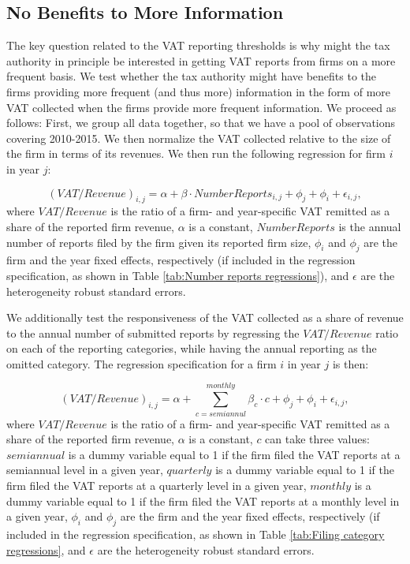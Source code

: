 \subsection{No Benefits to More Information}
\label{subsec:methodology-more-information}
The key question related to the VAT reporting thresholds is why might
the tax authority in principle be interested in getting VAT reports
from firms on a more frequent basis. We test whether the tax authority
might have benefits to the firms providing more frequent (and thus
more) information in the form of more VAT collected when the firms
provide more frequent information. We proceed as follows: First, we
group all data together, so that we have a pool of observations covering
2010-2015. We then normalize the VAT collected relative to the size
of the firm in terms of its revenues. We then run the following regression
for firm $i$ in year $j$:

\begin{equation}
(VAT/Revenue)_{i,j}=\alpha+\beta\cdot NumberReports_{i,j}+\phi_{j}+\phi_{i}+\epsilon_{i,j},
\end{equation}
where $VAT/Revenue$ is the ratio of a firm- and year-specific VAT
remitted as a share of the reported firm revenue, $\alpha$ is a constant,
$NumberReports$ is the annual number of reports filed by the firm
given its reported firm size, $\phi_{i}$ and $\phi_{j}$ are the
firm and the year fixed effects, respectively (if included in the
regression specification, as shown in Table \ref{tab:Number reports regressions}),
and $\epsilon$ are the heterogeneity robust standard errors.

We additionally test the responsiveness of the VAT collected as a
share of revenue to the annual number of submitted reports by regressing
the $VAT/Revenue$ ratio on each of the reporting categories, while
having the annual reporting as the omitted category. The regression
specification for a firm $i$ in year $j$ is then:

\begin{equation}
(VAT/Revenue)_{i,j}=\alpha+\sum_{c=semiannul}^{monthly}\beta_{c}\cdot c+\phi_{j}+\phi_{i}+\epsilon_{i,j},
\end{equation}
where $VAT/Revenue$ is the ratio of a firm- and year-specific VAT
remitted as a share of the reported firm revenue, $\alpha$ is a constant,
$c$ can take three values: $semiannual$ is a dummy variable equal
to 1 if the firm filed the VAT reports at a semiannual level in a
given year, $quarterly$ is a dummy variable equal to 1 if the firm
filed the VAT reports at a quarterly level in a given year, $monthly$
is a dummy variable equal to 1 if the firm filed the VAT reports at
a monthly level in a given year, $\phi_{i}$ and $\phi_{j}$ are the
firm and the year fixed effects, respectively (if included in the
regression specification, as shown in Table \ref{tab:Filing category regressions},
and $\epsilon$ are the heterogeneity robust standard errors.

